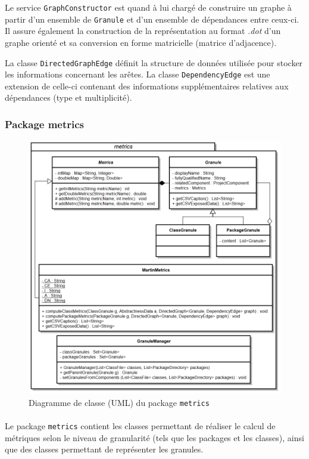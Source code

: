 \documentclass{scrartcl}
\begin{document}
    Le service \texttt{GraphConstructor} est quand à lui chargé de construire un graphe à partir d’un ensemble de \texttt{Granule} et d’un ensemble de dépendances entre ceux-ci. Il assure également la construction de la représentation au format \emph{.dot} d'un graphe orienté et sa conversion en forme matricielle (matrice d'adjacence).
    
    La classe \texttt{DirectedGraphEdge} définit la structure de données utilisée pour stocker les informations concernant les arêtes. La classe \texttt{DependencyEdge} est une extension de celle-ci contenant des informations supplémentaires relatives aux dépendances (type et multiplicité).

\subsubsection{Package metrics}

    \begin{figure}[h!]
        \centering
        \includegraphics[width=\textwidth]{img/uml/metrics.png}
        \caption{Diagramme de classe (UML) du package \texttt{metrics}}
    \end{figure}

    \paragraph{}Le package \texttt{metrics} contient les classes permettant de réaliser le calcul de métriques selon le niveau de granularité (tels que les packages et les classes), ainsi que des classes permettant de représenter les granules.
\end{document}
